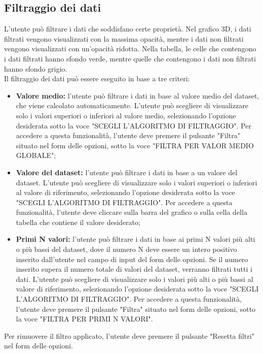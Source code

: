 \subsection{Filtraggio dei dati}
L'utente può filtrare i dati che soddisfano certe proprietà. Nel grafico 3D, i
dati filtrati vengono visualizzati con la massima opacità, mentre i dati non
filtrati vengono visualizzati con un'opacità ridotta. Nella tabella, le celle
che contengono i dati filtrati hanno sfondo verde, mentre quelle che contengono
i dati non filtrati hanno sfondo grigio. \\ Il filtraggio dei dati può essere
eseguito in base a tre criteri:
\begin{itemize}
    \item \textbf{Valore medio:} l'utente può filtrare i dati in base al valore
          medio del dataset, che viene calcolato automaticamente. L'utente può
          scegliere di visualizzare solo i valori superiori o inferiori al valore
          medio, selezionando l'opzione desiderata sotto la voce "SCEGLI
          L'ALGORITMO DI FILTRAGGIO". Per accedere a questa funzionalità, l'utente
          deve premere il pulsante "Filtra" situato nel
          form delle opzioni, sotto la voce "FILTRA PER VALOR MEDIO GLOBALE";
    \item \textbf{Valore del dataset:} l'utente può filtrare i dati in base a un
          valore del dataset. L'utente
          può scegliere di visualizzare solo i valori superiori o inferiori al
          valore di riferimento, selezionando l'opzione desiderata sotto la voce
          "SCEGLI L'ALGORITMO DI FILTRAGGIO". Per accedere a questa funzionalità,
          l'utente deve cliccare sulla barra del grafico o sulla cella della tabella che contiene il
          valore desiderato;
    \item \textbf{Primi N valori:} l'utente può filtrare i dati in base ai primi N
          valori più alti o più bassi del dataset, dove il numero N deve essere un intero positivo
          inserito dall'utente nel campo di input del form delle opzioni. Se il numero inserito supera il numero totale di valori
          del dataset, verranno filtrati tutti i dati. L'utente può scegliere di visualizzare solo i valori
          più alti o più bassi al valore di riferimento, selezionando l'opzione
          desiderata sotto la voce "SCEGLI L'ALGORITMO DI FILTRAGGIO". Per accedere a questa funzionalità,
          l'utente deve premere il pulsante "Filtra" situato nel form delle
          opzioni, sotto la voce "FILTRA PER PRIMI N VALORI".
\end{itemize}
Per rimuovere il filtro applicato, l'utente deve premere il pulsante "Resetta filtri" nel form delle opzioni.

